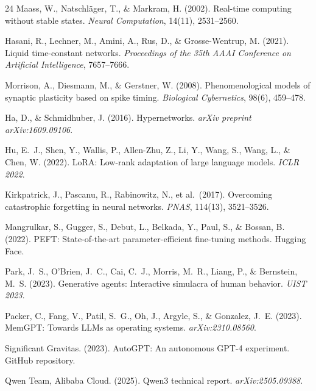 \documentclass[11pt,a4paper]{article}
\begin{document}
\begin{thebibliography}{24}
Maass, W., Natschl\"ager, T., \& Markram, H. (2002). Real-time computing without stable
states. \textit{Neural Computation}, 14(11), 2531--2560.

Hasani, R., Lechner, M., Amini, A., Rus, D., \& Grosse-Wentrup, M. (2021). Liquid
time-constant networks. \textit{Proceedings of the 35th AAAI Conference on Artificial
Intelligence}, 7657--7666.

Morrison, A., Diesmann, M., \& Gerstner, W. (2008). Phenomenological models of synaptic
plasticity based on spike timing. \textit{Biological Cybernetics}, 98(6), 459--478.

Ha, D., \& Schmidhuber, J. (2016). Hypernetworks. \textit{arXiv preprint
arXiv:1609.09106}.

Hu, E.\ J., Shen, Y., Wallis, P., Allen-Zhu, Z., Li, Y., Wang, S., Wang, L., \& Chen,
W. (2022). LoRA: Low-rank adaptation of large language models. \textit{ICLR 2022}.

Kirkpatrick, J., Pascanu, R., Rabinowitz, N., et al.\ (2017). Overcoming catastrophic
forgetting in neural networks. \textit{PNAS}, 114(13), 3521--3526.

Mangrulkar, S., Gugger, S., Debut, L., Belkada, Y., Paul, S., \& Bossan, B. (2022).
PEFT: State-of-the-art parameter-efficient fine-tuning methods. Hugging Face.

Park, J.\ S., O'Brien, J.\ C., Cai, C.\ J., Morris, M.\ R., Liang, P., \& Bernstein,
M.\ S. (2023). Generative agents: Interactive simulacra of human behavior.
\textit{UIST 2023}.

Packer, C., Fang, V., Patil, S.\ G., Oh, J., Argyle, S., \& Gonzalez, J.\ E. (2023).
MemGPT: Towards LLMs as operating systems. \textit{arXiv:2310.08560}.

Significant Gravitas. (2023). AutoGPT: An autonomous GPT-4 experiment. GitHub repository.

Qwen Team, Alibaba Cloud. (2025). Qwen3 technical report. \textit{arXiv:2505.09388}.

\end{thebibliography}
\end{document}
